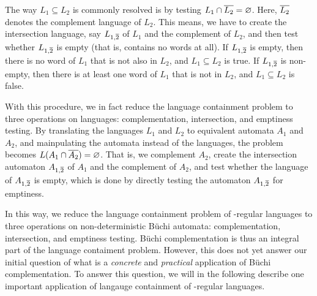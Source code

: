 The way $L_1 \subseteq L_2$ is commonly resolved is by testing $L_1 \cap \cl1{L_2} = \varnothing$. Here, $\cl1{L_2}$ denotes the complement language of $L_2$. This means, we have to create the intersection language, say $L_{1,\cl1{2}}$ of $L_1$ and the complement of $L_2$, and then test whether $L_{1,\cl1{2}}$ is empty (that is, contains no words at all). If $L_{1,\cl1{2}}$ is empty, then there is no word of $L_1$ that is not also in $L_2$, and $L_1 \subseteq L_2$ is true. If $L_{1,\cl1{2}}$ is non-empty, then there is at least one word of $L_1$ that is not in $L_2$, and $L_1 \subseteq L_2$ is false.

With this procedure, we in fact reduce the language containment problem to three operations on languages: complementation, intersection, and emptiness testing. By translating the languages $L_1$ and $L_2$ to equivalent automata $A_1$ and $A_2$, and mainpulating the automata instead of the languages, the problem becomes $L(A_1 \cap \cl1{A_2}) = \varnothing$. That is, we complement $A_2$, create the intersection automaton $A_{1,\cl1{2}}$ of $A_1$ and the complement of $A_2$, and test whether the language of $A_{1,\cl1{2}}$ is empty, which is done by directly testing the automaton $A_{1,\cl1{2}}$ for emptiness.

In this way, we reduce the language containment problem of \om-regular languages to three operations on non-deterministic Büchi automata: complementation, intersection, and emptiness testing. Büchi complementation is thus an integral part of the language contaiment problem. However, this does not yet answer our initial question of what is a \textit{concrete} and \textit{practical} application of Büchi complementation. To answer this question, we will in the following describe one important application of langauge containment of \om-regular languages.




